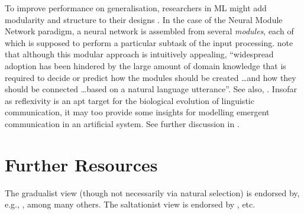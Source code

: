 \documentclass{article}
\begin{document}
To improve performance on generalisation, researchers in ML might add modularity and structure to their designs \citep{Andreas-et-al-2016, Gaunt-et-al-2016}. In the case of the Neural Module Network paradigm, a neural network is assembled from several {\it modules}, each of which is supposed to perform a particular subtask of the input processing. \citet{Bahdanau-et-al-2018} note that although this modular approach is intuitively appealing, ``widespread adoption has been hindered by the large amount of domain knowledge that is required to decide or predict how the modules should be created \ldots and how they should be connected \ldots based on a natural language utterance''. See also, \citet{Andreas-et-al-2016, Johnson-et-al-2016, Johnson-et-al-2017, Hu-et-al-2017}. %
%
Insofar as reflexivity is an apt target for the biological evolution of linguistic communication, it may too provide some insights for modelling emergent communication in an artificial system. See further discussion in \citet{LaCroix-If-Gradualism-2019, LaCroix-Dissertation}.

\section{Further Resources}

The gradualist view (though not necessarily via natural selection) is endorsed by, e.g., \citet{ %
    Givon-1979, 
        Givon-2002a, 
        Givon-2002b, 
        Givon-2009, 
    Pinker-Bloom-1990, 
    Newmeyer-1991, 
        Newmeyer-1998, 
        Newmeyer-2005, 
    Jackendoff-1999, 
        Jackendoff-2002, 
    Carstairs-McCarthy-1999, 
    Fitch-2004, 
        Fitch-2010, 
    Culicover-Jackendoff-2005, 
    Szamado-Szathmary-2006,
    Progovac-2006, 
        Progovac-2009a, 
        Progovac-2009b, 
        Progovac-2013, 
        Progovac-2015, 
        Progovac-2019, 
    Tallerman-2007, 
        Tallerman-2013a, 
        Tallerman-2013b, 
        Tallerman-2014a, 
        Tallerman-2014b,
    Heine-Kuteva-2007, 
    Hurford-2007, 
        Hurford-2012,
    Tallerman-Gibson-2011,
    Yang-2013}, among many others.
%
The saltationist view is endorsed by \citet{%
    Berwick-1998, 
        Berwick-et-al-2013, 
        Berwick-Hauser-Tattersall-2013, 
    Bickerton-1990, 
        Bickerton-1998, 
    Lightfoot-1991, 
    Hauser-et-al-2002, 
    Chomsky-2002, 
        Chomsky-2005, 
        Chomsky-2010, 
    Piattelli-Palmarini-Uriagereka-2004,
        Piattelli-Palmarini-Uriagereka-2011, 
    Moro-2008, 
    Hornstein-2008, 
    Piattelli-Palmarini-2010, 
    Berwick-Chomsky-2011, 
        Berwick-Chomsky-2016, 
    Di-Sciullo-2011, 
        Di-Sciullo-2013, 
    Bolhuis-et-al-2014, 
    Miyagawa-et-al-2014, 
        Miyagawa-2017}, etc.
\end{document}
